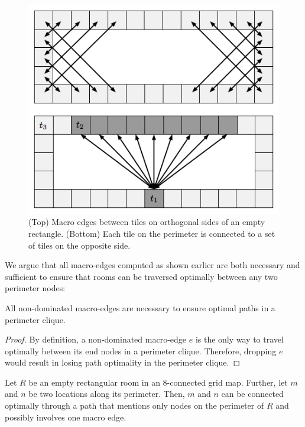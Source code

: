 \begin{figure}[tb]
       \begin{center}
                       \includegraphics[scale=0.45, trim = 10mm 10mm 10mm 0mm]{diagrams/macroedges.png}
       \end{center}
	\vspace{-3pt}
       \caption{(Top) Macro edges between tiles on orthogonal sides of an empty rectangle. 
(Bottom) Each tile on the perimeter is connected to a set of tiles on the opposite side.}
       \label{fig-macroedges}
\end{figure}

We argue that all macro-edges computed as shown earlier are both necessary and sufficient
to ensure that rooms can be traversed optimally between any two perimeter nodes:

\begin{proposition}
All non-dominated macro-edges are necessary to ensure optimal paths in a perimeter clique.
\end{proposition}
\begin{proof}
By definition, a non-dominated macro-edge $e$ is the only way to travel optimally between 
its end nodes in a perimeter clique. Therefore, dropping $e$ would result in losing path optimality
in the perimeter clique.
\end{proof}

\begin{lemma}
\label{lemma-rooms}
Let $R$ be an empty rectangular room in an 8-connected grid map.
Further, let $m$ and $n$ be two locations along its perimeter.
Then, $m$ and $n$ can be connected optimally through a path that mentions only nodes on the perimeter of $R$ and
possibly involves one macro edge.
\end{lemma}

